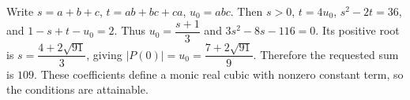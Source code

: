Write $s=a+b+c$, $t=ab+bc+ca$, $u_0=abc$. Then $s>0$, $t=4u_0$, $s^2-2t=36$, and $1-s+t-u_0=2$. Thus $u_0=\dfrac{s+1}{3}$ and $3s^2-8s-116=0$. Its positive root is $s=\dfrac{4+2\sqrt{91}}{3}$, giving $|P(0)|=u_0=\dfrac{7+2\sqrt{91}}{9}$. Therefore the requested sum is $\boxed{109}$. These coefficients define a monic real cubic with nonzero constant term, so the conditions are attainable.
